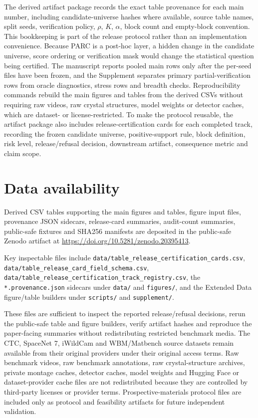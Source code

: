 \documentclass[10pt,twocolumn]{article}
\begin{document}
The derived artifact package records the exact table provenance for each main number, including candidate-universe hashes where available, source table names, split seeds, verification policy, \(\rho\), \(K\), \(\alpha\), block count and empty-block convention.
This bookkeeping is part of the release protocol rather than an implementation convenience.
Because PARC is a post-hoc layer, a hidden change in the candidate universe, score ordering or verification mask would change the statistical question being certified.
The manuscript reports pooled main rows only after the per-seed files have been frozen, and the Supplement separates primary partial-verification rows from oracle diagnostics, stress rows and breadth checks.
Reproducibility commands rebuild the main figures and tables from the derived CSVs without requiring raw videos, raw crystal structures, model weights or detector caches, which are dataset- or license-restricted.
To make the protocol reusable, the artifact package also includes release-certification cards for each completed track, recording the frozen candidate universe, positive-support rule, block definition, risk level, release/refusal decision, downstream artifact, consequence metric and claim scope.

\section*{Data availability}

Derived CSV tables supporting the main figures and tables, figure input files, provenance JSON sidecars, release-card summaries, audit-count summaries, public-safe fixtures and SHA256 manifests are deposited in the public-safe Zenodo artifact at \href{https://doi.org/10.5281/zenodo.20395413}{https://doi.org/10.5281/zenodo.20395413}.
\begin{sloppypar}
Key inspectable files include \texttt{data/table\_release\_\allowbreak certification\_\allowbreak cards.csv}, \texttt{data/table\_release\_\allowbreak card\_\allowbreak field\_\allowbreak schema.csv}, \texttt{data/table\_release\_\allowbreak certification\_\allowbreak track\_\allowbreak registry.csv}, the \texttt{*.provenance.json} sidecars under \texttt{data/} and \texttt{figures/}, and the Extended Data figure/table builders under \texttt{scripts/} and \texttt{supplement/}.
\end{sloppypar}
These files are sufficient to inspect the reported release/refusal decisions, rerun the public-safe table and figure builders, verify artifact hashes and reproduce the paper-facing summaries without redistributing restricted benchmark media.
The CTC, SpaceNet 7, iWildCam and WBM/Matbench source datasets remain available from their original providers under their original access terms.
Raw benchmark videos, raw benchmark annotations, raw crystal-structure archives, private montage caches, detector caches, model weights and Hugging Face or dataset-provider cache files are not redistributed because they are controlled by third-party licenses or provider terms.
Prospective-materials protocol files are included only as protocol and feasibility artifacts for future independent validation.
\end{document}
